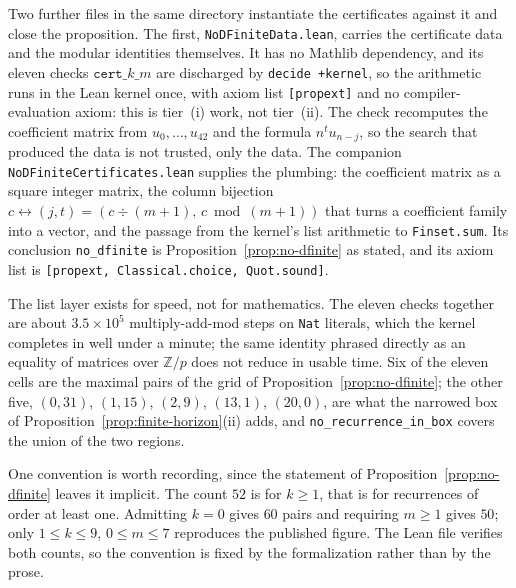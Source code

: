 \documentclass[11pt]{article}
\theoremstyle{plain}
\theoremstyle{definition}
\theoremstyle{remark}
\begin{document}
Two further files in the same directory instantiate the certificates against it and close the
proposition. The first, \texttt{NoDFiniteData.lean}, carries the certificate data and the
modular identities themselves. It has no Mathlib dependency, and its eleven checks
$\texttt{cert\_}k\texttt{\_}m$ are discharged by \texttt{decide +kernel}, so the arithmetic
runs in the Lean kernel once, with axiom list \texttt{[propext]} and no compiler-evaluation
axiom: this is tier~(i) work, not tier~(ii). The check recomputes the coefficient matrix from
$u_0,\ldots,u_{42}$ and the formula $n^t u_{n-j}$, so the search that produced the data is not
trusted, only the data. The companion \texttt{NoDFiniteCertificates.lean} supplies the
plumbing: the coefficient matrix as a square integer matrix, the column bijection
$c \leftrightarrow (j,t) = (c \div (m{+}1),\, c \bmod (m{+}1))$ that turns a coefficient family
into a vector, and the passage from the kernel's list arithmetic to \texttt{Finset.sum}. Its
conclusion \texttt{no\_dfinite} is Proposition~\ref{prop:no-dfinite} as stated, and its axiom
list is \texttt{[propext, Classical.choice, Quot.sound]}.

The list layer exists for speed, not for mathematics. The eleven checks together are about
$3.5 \times 10^5$ multiply-add-mod steps on \texttt{Nat} literals, which the kernel completes
in well under a minute; the same identity phrased directly as an equality of matrices over
$\mathbb{Z}/p$ does not reduce in usable time. Six of the eleven cells are the maximal pairs
of the grid of Proposition~\ref{prop:no-dfinite}; the other five, $(0,31)$, $(1,15)$, $(2,9)$,
$(13,1)$, $(20,0)$, are what the narrowed box of Proposition~\ref{prop:finite-horizon}(ii)
adds, and \texttt{no\_recurrence\_in\_box} covers the union of the two regions.

One convention is worth recording, since the statement of Proposition~\ref{prop:no-dfinite}
leaves it implicit. The count $52$ is for $k \ge 1$, that is for recurrences of order at least
one. Admitting $k=0$ gives $60$ pairs and requiring $m \ge 1$ gives $50$; only
$1 \le k \le 9$, $0 \le m \le 7$ reproduces the published figure. The Lean file verifies both
counts, so the convention is fixed by the formalization rather than by the prose.
\end{document}
